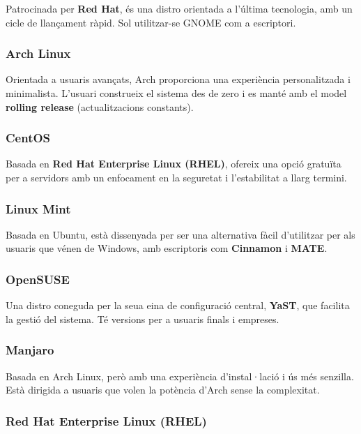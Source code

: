 \documentclass[
  a4paper,
]{article}
\begin{document}
Patrocinada per \textbf{Red Hat}, és una distro orientada a l'última
tecnologia, amb un cicle de llançament ràpid. Sol utilitzar-se GNOME com
a escriptori.

\subsubsection{Arch Linux}\label{arch-linux}

Orientada a usuaris avançats, Arch proporciona una experiència
personalitzada i minimalista. L'usuari construeix el sistema des de zero
i es manté amb el model \textbf{rolling release} (actualitzacions
constants).

\subsubsection{CentOS}\label{centos}

Basada en \textbf{Red Hat Enterprise Linux (RHEL)}, ofereix una opció
gratuïta per a servidors amb un enfocament en la seguretat i
l'estabilitat a llarg termini.

\subsubsection{Linux Mint}\label{linux-mint}

Basada en Ubuntu, està dissenyada per ser una alternativa fàcil
d'utilitzar per als usuaris que vénen de Windows, amb escriptoris com
\textbf{Cinnamon} i \textbf{MATE}.

\subsubsection{OpenSUSE}\label{opensuse}

Una distro coneguda per la seua eina de configuració central,
\textbf{YaST}, que facilita la gestió del sistema. Té versions per a
usuaris finals i empreses.

\subsubsection{Manjaro}\label{manjaro}

Basada en Arch Linux, però amb una experiència d'instal·lació i ús més
senzilla. Està dirigida a usuaris que volen la potència d'Arch sense la
complexitat.

\subsubsection{Red Hat Enterprise Linux
(RHEL)}\label{red-hat-enterprise-linux-rhel}
\end{document}
